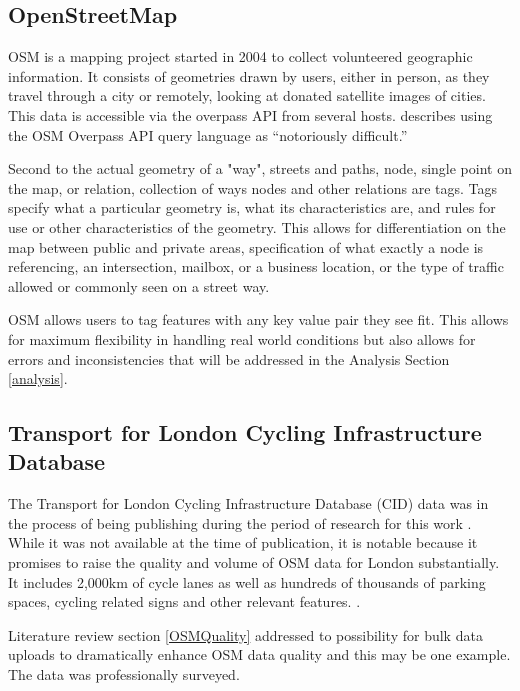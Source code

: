
\subsection{OpenStreetMap} 


OSM is a mapping project started in 2004 to collect volunteered geographic information. It consists of geometries drawn by users, either in person, as they travel through a city or remotely, looking at donated satellite images of cities. This data is accessible via the overpass API from several hosts. \textcite{osmnx} describes using the OSM Overpass API query language as ``notoriously difficult.''


Second to the actual geometry of a "way", streets and paths, node, single point on the map, or relation, collection of ways nodes and other relations are tags. Tags specify what a particular geometry is, what its characteristics are, and rules for use or other characteristics of the geometry. This allows for differentiation on the map between public and private areas, specification of what exactly a node is referencing, an intersection, mailbox, or a business location, or the type of traffic allowed or commonly seen on a street way. 

OSM allows users to tag features with any key value pair they see fit. This allows for maximum flexibility in handling real world conditions but also allows for errors and inconsistencies that will be addressed in the Analysis Section \ref{analysis}.

\subsection{Transport for London Cycling Infrastructure Database}\label{tflcidlit}

The Transport for London Cycling Infrastructure Database (CID) data was in the process of being publishing during the period of research for this work \parencite{tflcid}. While it was not available at the time of publication, it is notable because it promises to raise the quality and volume of OSM data for London substantially. It includes 2,000km of cycle lanes as well as hundreds of thousands of parking spaces, cycling related signs and other relevant features. \parencite{osmtflcidwiki}. 

Literature review section \ref{OSMQuality} addressed to possibility for bulk data uploads to dramatically enhance OSM data quality and this may be one example. The data was professionally surveyed. 

